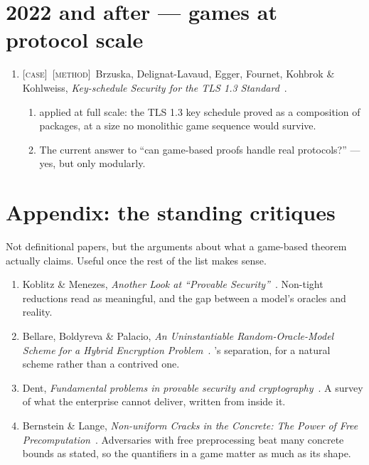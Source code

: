 \documentclass[11pt]{article}
\newcommand{\kind}[1]{{\footnotesize\textsc{\textcolor{yearcolor}{[#1]}}}\ }
\newcommand{\method}{\kind{method}}
\newcommand{\case}{\kind{case}}
\newcommand{\paper}[3]{#1, \emph{#2}~\cite{#3}.}
\begin{document}
\section{2022 and after --- games at protocol scale}

\begin{enumerate}
  \item \case\method \paper{Brzuska, Delignat-Lavaud, Egger, Fournet, Kohbrok \&
    Kohlweiss}{Key-schedule Security for the TLS 1.3 Standard}{BDEFKK22}
    \begin{enumerate}
      \item \cite{SSP18} applied at full scale: the TLS 1.3 key schedule proved
        as a composition of packages, at a size no monolithic game sequence
        would survive.
      \item The current answer to ``can game-based proofs handle real
        protocols?'' --- yes, but only modularly.
    \end{enumerate}
\end{enumerate}

\section{Appendix: the standing critiques}

\noindent
Not definitional papers, but the arguments about what a game-based theorem
actually claims. Useful once the rest of the list makes sense.

\begin{enumerate}
  \item \paper{Koblitz \& Menezes}{Another Look at ``Provable Security''}{KM04}
    Non-tight reductions read as meaningful, and the gap between a model's
    oracles and reality.
  \item \paper{Bellare, Boldyreva \& Palacio}{An Uninstantiable
    Random-Oracle-Model Scheme for a Hybrid Encryption Problem}{BBP03}
    \cite{CGH04}'s separation, for a natural scheme rather than a contrived one.
  \item \paper{Dent}{Fundamental problems in provable security and
    cryptography}{Dent06} A survey of what the enterprise cannot deliver,
    written from inside it.
  \item \paper{Bernstein \& Lange}{Non-uniform Cracks in the Concrete: The Power
    of Free Precomputation}{BL13} Adversaries with free preprocessing beat many
    concrete bounds as stated, so the quantifiers in a game matter as much as
    its shape.
\end{enumerate}
\end{document}
